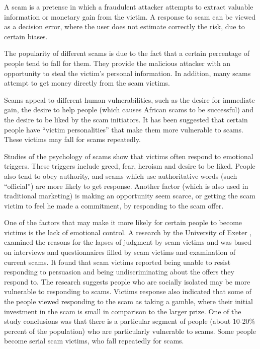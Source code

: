 \documentclass{sig-alternate}
\begin{document}
A scam is a pretense in which a fraudulent attacker attempts to extract valuable information or monetary gain from the victim. A response to scam can be viewed as a decision error, where the user does not estimate correctly the risk, due to certain biases.

The popularity of different scams is due to the fact that a certain percentage of people tend to fall for them. They provide the malicious attacker with an opportunity to steal 
the victim's 
personal information.
In addition, many scams attempt to get money directly from the scam victims.  

Scams appeal to different human vulnerabilities, such as the desire for immediate gain, the desire to help people (which causes African scams to be successful) and the desire to be liked by the scam initiators. It has been suggested that certain people have ``victim personalities'' that make them more vulnerable to scams. These victims may fall for scams repeatedly.

Studies of the psychology of scams show that victims often respond to emotional triggers. These triggers include greed, fear, heroism and desire to be liked.  People also tend to obey authority, and scams which use authoritative words (such ``official'') are more likely to get response. Another factor (which is also used in traditional marketing) is making an opportunity seem scarce, or getting the scam victim to feel he made a commitment, by responding to the scam offer.



One of the factors that may 
make it more likely for
certain people 
to become victims is the lack of emotional control. A research by the University of Exeter \cite{ScamPsychology}, examined the reasons for the lapses of judgment by scam victims and was based on interviews and questionnaires filled by scam victims and examination of current scams.
It found that scam victims reported being unable to resist responding to persuasion and being undiscriminating about the offers they respond to. The research suggests people who are socially isolated may be more vulnerable to responding to scams.
Victims response also indicated that some of the people viewed responding to the scam as taking a gamble, 
where
their initial investment in the scam 
is
small in comparison to the larger prize. 
One of the study conclusions was
that there is a particular segment of people (about 10-20\% percent of the population) who are particularly vulnerable to scams. Some people become serial scam victims, who fall repeatedly for scams. 
\end{document}
